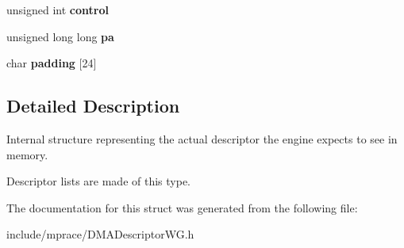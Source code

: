 \begin{CompactItemize}
\item 
\hypertarget{structmprace_1_1DMADescriptorWG_1_1descriptor_o7}{
unsigned int {\bf control}}
\label{structmprace_1_1DMADescriptorWG_1_1descriptor_o7}

\item 
\hypertarget{structmprace_1_1DMADescriptorWG_1_1descriptor_o8}{
unsigned long long {\bf pa}}
\label{structmprace_1_1DMADescriptorWG_1_1descriptor_o8}

\item 
\hypertarget{structmprace_1_1DMADescriptorWG_1_1descriptor_o9}{
char {\bf padding} \mbox{[}24\mbox{]}}
\label{structmprace_1_1DMADescriptorWG_1_1descriptor_o9}

\end{CompactItemize}


\subsection{Detailed Description}
Internal structure representing the actual descriptor the engine expects to see in memory. 

Descriptor lists are made of this type.



The documentation for this struct was generated from the following file:\begin{CompactItemize}
\item 
include/mprace/DMADescriptor\-WG.h\end{CompactItemize}
